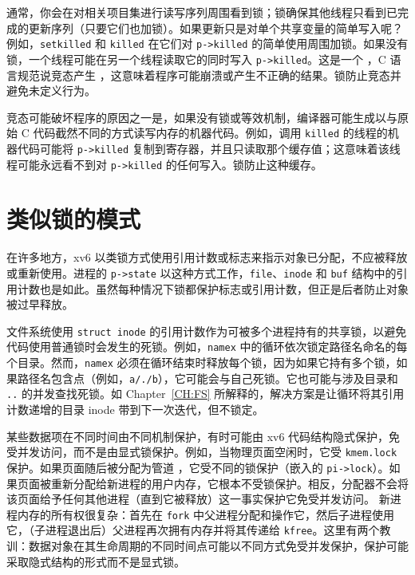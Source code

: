 通常，你会在对相关项目集进行读写序列周围看到锁；锁确保其他线程只看到已完成的更新序列（只要它们也加锁）。如果更新只是对单个共享变量的简单写入呢？例如，\texttt{setkilled} 和 \texttt{killed}  在它们对 \lstinline{p->killed} 的简单使用周围加锁。如果没有锁，一个线程可能在另一个线程读取它的同时写入 \lstinline{p->killed}。这是一个 ，C 语言规范说竞态产生 ，这意味着程序可能崩溃或产生不正确的结果。锁防止竞态并避免未定义行为。

竞态可能破坏程序的原因之一是，如果没有锁或等效机制，编译器可能生成以与原始 C 代码截然不同的方式读写内存的机器代码。例如，调用 \texttt{killed} 的线程的机器代码可能将 \lstinline{p->killed} 复制到寄存器，并且只读取那个缓存值；这意味着该线程可能永远看不到对 \lstinline{p->killed} 的任何写入。锁防止这种缓存。


\section{类似锁的模式}

在许多地方，xv6 以类锁方式使用引用计数或标志来指示对象已分配，不应被释放或重新使用。进程的 {\tt p->state} 以这种方式工作，{\tt file}、{\tt inode} 和 {\tt buf} 结构中的引用计数也是如此。虽然每种情况下锁都保护标志或引用计数，但正是后者防止对象被过早释放。

文件系统使用 {\tt struct inode} 的引用计数作为可被多个进程持有的共享锁，以避免代码使用普通锁时会发生的死锁。例如，{\tt namex}  中的循环依次锁定路径名命名的每个目录。然而，{\tt namex} 必须在循环结束时释放每个锁，因为如果它持有多个锁，如果路径名包含点（例如，{\tt a/./b}），它可能会与自己死锁。它也可能与涉及目录和 {\tt ..} 的并发查找死锁。如 Chapter~\ref{CH:FS} 所解释的，解决方案是让循环将其引用计数递增的目录 inode 带到下一次迭代，但不锁定。

某些数据项在不同时间由不同机制保护，有时可能由 xv6 代码结构隐式保护，免受并发访问，而不是由显式锁保护。例如，当物理页面空闲时，它受 \texttt{kmem.lock}  保护。如果页面随后被分配为管道 ，它受不同的锁保护（嵌入的 \lstinline{pi->lock}）。如果页面被重新分配给新进程的用户内存，它根本不受锁保护。相反，分配器不会将该页面给予任何其他进程（直到它被释放）这一事实保护它免受并发访问。
新进程内存的所有权很复杂：首先在 {\tt fork} 中父进程分配和操作它，然后子进程使用它，（子进程退出后）父进程再次拥有内存并将其传递给 {\tt kfree}。这里有两个教训：数据对象在其生命周期的不同时间点可能以不同方式免受并发保护，保护可能采取隐式结构的形式而不是显式锁。


